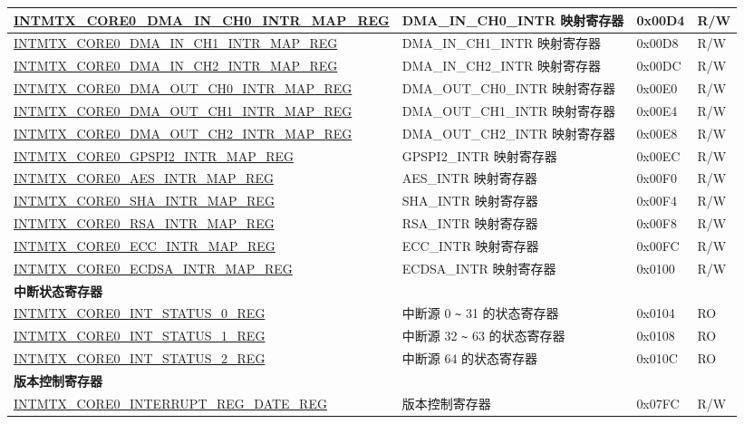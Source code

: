 \begin{longtable}{ | p{10cm} | m{10cm} | m{1.3cm} | m{1.0cm} | }
\hyperref[regdesc:INTMTXCORE0DMAINCH0INTRMAPREG]{INTMTX\_CORE0\_DMA\_IN\_CH0\_INTR\_MAP\_REG} & DMA\_IN\_CH0\_INTR 映射寄存器 & 0x00D4 & R/W \\ \hline
\hyperref[regdesc:INTMTXCORE0DMAINCH1INTRMAPREG]{INTMTX\_CORE0\_DMA\_IN\_CH1\_INTR\_MAP\_REG} & DMA\_IN\_CH1\_INTR 映射寄存器 & 0x00D8 & R/W \\ \hline
\hyperref[regdesc:INTMTXCORE0DMAINCH2INTRMAPREG]{INTMTX\_CORE0\_DMA\_IN\_CH2\_INTR\_MAP\_REG} & DMA\_IN\_CH2\_INTR 映射寄存器 & 0x00DC & R/W \\ \hline
\hyperref[regdesc:INTMTXCORE0DMAOUTCH0INTRMAPREG]{INTMTX\_CORE0\_DMA\_OUT\_CH0\_INTR\_MAP\_REG} & DMA\_OUT\_CH0\_INTR 映射寄存器 & 0x00E0 & R/W \\ \hline
\hyperref[regdesc:INTMTXCORE0DMAOUTCH1INTRMAPREG]{INTMTX\_CORE0\_DMA\_OUT\_CH1\_INTR\_MAP\_REG} & DMA\_OUT\_CH1\_INTR 映射寄存器 & 0x00E4 & R/W \\ \hline
\hyperref[regdesc:INTMTXCORE0DMAOUTCH2INTRMAPREG]{INTMTX\_CORE0\_DMA\_OUT\_CH2\_INTR\_MAP\_REG} & DMA\_OUT\_CH2\_INTR 映射寄存器 & 0x00E8 & R/W \\ \hline
\hyperref[regdesc:INTMTXCORE0GPSPI2INTRMAPREG]{INTMTX\_CORE0\_GPSPI2\_INTR\_MAP\_REG} & GPSPI2\_INTR 映射寄存器 & 0x00EC & R/W \\ \hline
\hyperref[regdesc:INTMTXCORE0AESINTRMAPREG]{INTMTX\_CORE0\_AES\_INTR\_MAP\_REG} & AES\_INTR 映射寄存器 & 0x00F0 & R/W \\ \hline
\hyperref[regdesc:INTMTXCORE0SHAINTRMAPREG]{INTMTX\_CORE0\_SHA\_INTR\_MAP\_REG} & SHA\_INTR 映射寄存器 & 0x00F4 & R/W \\ \hline
\hyperref[regdesc:INTMTXCORE0RSAINTRMAPREG]{INTMTX\_CORE0\_RSA\_INTR\_MAP\_REG} & RSA\_INTR 映射寄存器 & 0x00F8 & R/W \\ \hline
\hyperref[regdesc:INTMTXCORE0ECCINTRMAPREG]{INTMTX\_CORE0\_ECC\_INTR\_MAP\_REG} & ECC\_INTR 映射寄存器 & 0x00FC & R/W \\ \hline
\hyperref[regdesc:INTMTXCORE0ECDSAINTRMAPREG]{INTMTX\_CORE0\_ECDSA\_INTR\_MAP\_REG} & ECDSA\_INTR 映射寄存器 & 0x0100 & R/W \\ \hline
\multicolumn{4}{|l|}{\textbf{中断状态寄存器}} \\ \hline
\hyperref[regdesc:INTMTXCORE0INTSTATUS0REG]{INTMTX\_CORE0\_INT\_STATUS\_0\_REG} & 中断源 0 \verb+~+ 31 的状态寄存器 & 0x0104 & RO \\ \hline
\hyperref[regdesc:INTMTXCORE0INTSTATUS1REG]{INTMTX\_CORE0\_INT\_STATUS\_1\_REG} & 中断源 32 \verb+~+ 63 的状态寄存器 & 0x0108 & RO \\ \hline
\hyperref[regdesc:INTMTXCORE0INTSTATUS2REG]{INTMTX\_CORE0\_INT\_STATUS\_2\_REG} & 中断源 64 的状态寄存器 & 0x010C & RO \\ \hline
\multicolumn{4}{|l|}{\textbf{版本控制寄存器}} \\ \hline
\hyperref[regdesc:INTMTXCORE0INTERRUPTREGDATEREG]{INTMTX\_CORE0\_INTERRUPT\_REG\_DATE\_REG} & 版本控制寄存器 & 0x07FC & R/W \\ \hline
\end{longtable}
